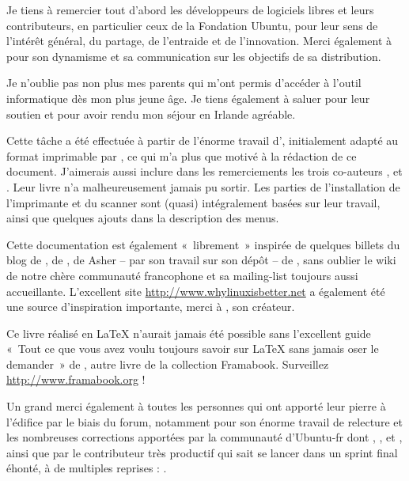\begin{Remerciements}
Je tiens à remercier tout d'abord les développeurs de logiciels libres et leurs contributeurs, en particulier ceux de la Fondation Ubuntu, pour leur sens de l'intérêt général, du partage, de l'entraide et de l'innovation. Merci également à  pour son dynamisme et sa communication sur les objectifs de sa distribution.\par
Je n'oublie pas non plus mes parents qui m'ont permis d'accéder à l'outil informatique dès mon plus jeune âge. Je tiens également à saluer  pour leur soutien et pour avoir rendu mon séjour en Irlande agréable.\par
Cette tâche a été effectuée à partir de l'énorme travail d', initialement adapté au format imprimable par , ce qui m'a plus que motivé à la rédaction de ce document. J'aimerais aussi inclure dans les remerciements les trois co-auteurs ,  et . Leur livre n'a malheureusement jamais pu sortir. Les parties de l'installation de l'imprimante et du scanner sont (quasi) intégralement basées sur leur travail, ainsi que quelques ajouts dans la description des menus.\par
Cette documentation est également «~librement~» inspirée de quelques billets du blog de , de , de Asher -- par son travail sur son dépôt -- de  , sans oublier le wiki de notre chère communauté francophone et sa mailing-list toujours aussi accueillante. L'excellent site \url{http://www.whylinuxisbetter.net} a également été une source d'inspiration importante, merci à  , son créateur.\par
Ce livre réalisé en \LaTeX{} n'aurait jamais été possible sans l'excellent guide «~Tout ce que vous avez voulu toujours savoir sur \LaTeX{} sans jamais oser le demander~» de , autre livre de la collection Framabook. Surveillez \url{http://www.framabook.org} !\par
Un grand merci également à toutes les personnes qui ont apporté leur pierre à l'édifice par le biais du forum, notamment  pour son énorme travail de relecture et les nombreuses corrections apportées par la communauté d'Ubuntu-fr dont , ,  et , ainsi que par le contributeur très productif qui sait se lancer dans un sprint final éhonté, à de multiples reprises : .\par

\end{Remerciements}
